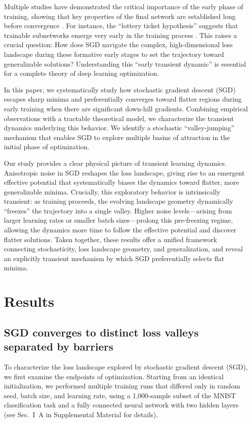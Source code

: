 \documentclass[aps,prx,reprint,superscriptaddress,longbibliography,nofootinbib,floatfix]{revtex4-2}
\begin{document}
Multiple studies have demonstrated the critical importance of the early phase of training, showing that key properties of the final network are established long before convergence \cite{gur-ariGradientDescentHappens2018,achilleCriticalLearningPeriods2019,fengPhasesLearningDynamics2021a,kalraPhaseDiagramEarly2023,jastrzebskiBreakEvenPointOptimization2020}. For instance, the ``lottery ticket hypothesis'' suggests that trainable subnetworks emerge very early in the training process \cite{frankleLotteryTicketHypothesis2019}. This raises a crucial question: How does SGD navigate the complex, high-dimensional loss landscape during these formative early stages to set the trajectory toward generalizable solutions? Understanding this ``early transient dynamic'' is essential for a complete theory of deep learning optimization.

In this paper, we systematically study how stochastic gradient descent (SGD) escapes sharp minima and preferentially converges toward flatter regions during early training when there are significant down-hill gradients. Combining empirical observations with a tractable theoretical model, we characterize the transient dynamics underlying this behavior. We identify a stochastic ``valley-jumping'' mechanism that enables SGD to explore multiple basins of attraction in the initial phase of optimization.

Our study provides a clear physical picture of transient learning dynamics. Anisotropic noise in SGD reshapes the loss landscape, giving rise to an emergent effective potential that systematically biases the dynamics toward flatter, more generalizable minima. Crucially, this exploratory behavior is intrinsically transient: as training proceeds, the evolving landscape geometry dynamically ``freezes'' the trajectory into a single valley. Higher noise levels—arising from larger learning rates or smaller batch sizes—prolong this pre-freezing regime, allowing the dynamics more time to follow the effective potential and discover flatter solutions. Taken together, these results offer a unified framework connecting stochasticity, loss landscape geometry, and generalization, and reveal an explicitly transient mechanism by which SGD preferentially selects flat minima.

\section{Results}
\subsection{SGD converges to distinct loss valleys separated by barriers}
To characterize the loss landscape explored by stochastic gradient descent (SGD), we first examine the endpoints of optimization. Starting from an identical initialization, we performed multiple training runs that differed only in random seed, batch size, and learning rate, using a 1,000-sample subset of the MNIST classification task and a fully connected neural network with two hidden layers (see Sec.~I~A in Supplemental Material for details).
\end{document}
